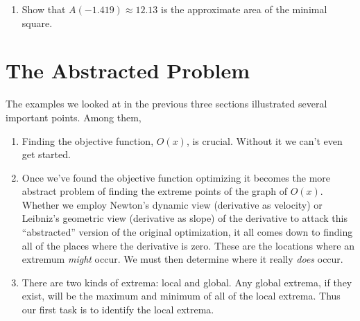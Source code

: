 \begin{embeddedproblem}
\begin{enumerate}[label={\bf{}(\alph*)}]
    Newton's Method
    to show that $x\approx-1.419$ is an approximate solution of
    $\dfdx{A}{x}=0$.
  \item Show that $A(-1.419)\approx 12.13$ is the approximate area
    of the minimal square.
  \end{enumerate}
\end{embeddedproblem}


\section{The Abstracted Problem}
\label{subsec:optim-abstr-probl}

The examples we looked at in the previous three sections illustrated several
important points. Among them,
\begin{enumerate}
\item Finding the objective function, $O(x)$, is crucial. Without it we can't even
  get started.
\item Once we've found the objective function optimizing it becomes
  the more abstract problem of finding the extreme points of the graph of
  $O(x)$. Whether we  employ Newton's dynamic view
  (derivative as velocity) or Leibniz's geometric view (derivative as
  slope) of the derivative to attack this ``abstracted'' version of
  the original optimization,  it all comes down  to finding all of
  the places where the derivative is zero. These are the locations
  where an extremum \emph{might} occur. We must then determine where it really \emph{does} occur.
\item There are two kinds of extrema: local and global. Any global
  extrema, if they exist, will be the maximum and minimum of all of
  the local extrema. Thus our first task is to identify the local
  extrema. 
\end{enumerate}

